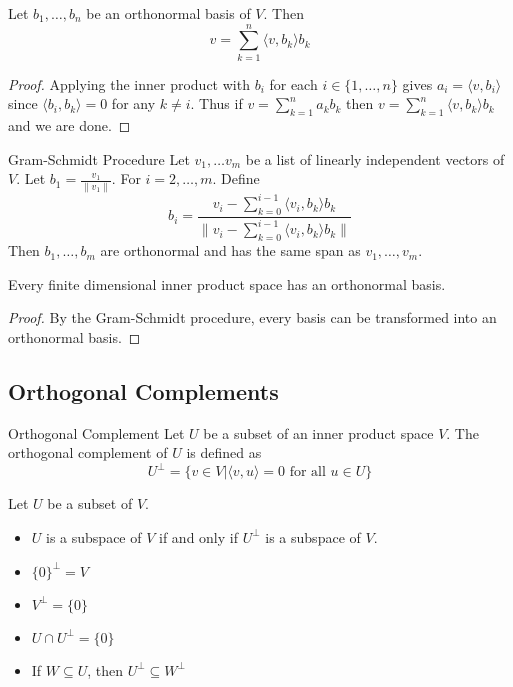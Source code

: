 \begin{prp}{}{} Let $b_1,\dots,b_n$ be an orthonormal basis of $V$. Then $$v=\sum_{k=1}^n\langle v,b_k\rangle b_k$$ \tcbline
\begin{proof}
Applying the inner product with $b_i$ for each $i\in\{1,\dots,n\}$ gives $a_i=\langle v,b_i\rangle$ since $\langle b_i,b_k\rangle=0$ for any $k\neq i$. Thus if $v=\sum_{k=1}^na_kb_k$ then $v=\sum_{k=1}^n\langle v,b_k\rangle b_k$ and we are done. 
\end{proof}
\end{prp}

\begin{thm}{Gram-Schmidt Procedure}{} Let $v_1,\dots v_m$ be a list of linearly independent vectors of $V$. Let $b_1=\frac{v_1}{\|v_1\|}$. For $i=2,\dots,m$. Define $$b_i=\frac{v_i-\sum_{k=0}^{i-1}\langle v_i,b_k\rangle b_k}{\|v_i-\sum_{k=0}^{i-1}\langle v_i,b_k\rangle b_k\|}$$ Then $b_1,\dots,b_m$ are orthonormal and has the same span as $v_1,\dots,v_m$. 
\end{thm}

\begin{thm}{}{} Every finite dimensional inner product space has an orthonormal basis. \tcbline
\begin{proof}
By the Gram-Schmidt procedure, every basis can be transformed into an orthonormal basis. 
\end{proof}
\end{thm}

\subsection{Orthogonal Complements}
\begin{defn}{Orthogonal Complement}{} Let $U$ be a subset of an inner product space $V$. The orthogonal complement of $U$ is defined as $$U^{\perp}=\{v\in V|\langle v,u\rangle=0\text{ for all }u\in U\}$$
\end{defn}

\begin{prp}{}{} Let $U$ be a subset of $V$. 
\begin{itemize}
\item $U$ is a subspace of $V$ if and only if $U^\perp$ is a subspace of $V$. 
\item $\{0\}^\perp=V$
\item $V^\perp=\{0\}$
\item $U\cap U^\perp=\{0\}$
\item If $W\subseteq U$, then $U^\perp\subseteq W^\perp$
\end{itemize}
\end{prp}

